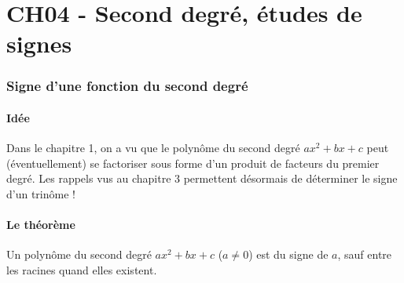 \documentclass[a4paper,11pt]{article}
\author{Pierquet}
\title{\nomfichier}
\begin{document}
\pagestyle{fancy}

\part{CH04 - Second degré, études de signes}

\section{Signe d'une fonction du second degré}

\subsection{Idée}

\begin{cidee}
Dans le chapitre 1, on a vu que le polynôme du second degré $ax^2+bx+c$ peut (éventuellement) se factoriser sous forme d'un produit de facteurs du premier degré. Les rappels vus au chapitre 3 permettent désormais de déterminer le signe d'un trinôme !
\end{cidee}

\subsection{Le théorème}

\begin{cthm}
Un polynôme du second degré $ax^2+bx+c$ ($a \neq 0$) est du signe de $a$, sauf entre les racines quand elles existent.
\end{cthm}
\end{document}
